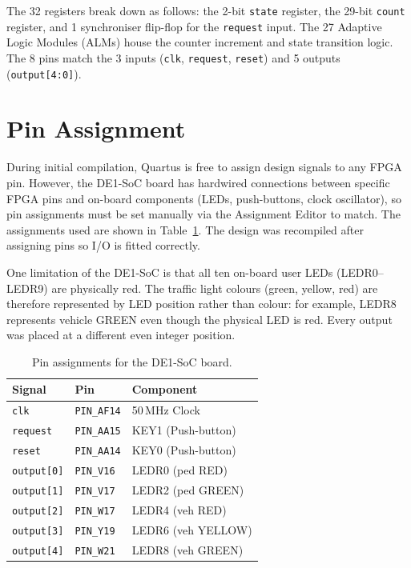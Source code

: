 \documentclass[10pt,a4paper]{article}
\theoremstyle{definition} %
\begin{document}
The 32 registers break down as follows: the 2-bit \texttt{state} register, the 29-bit \texttt{count} register, and 1 synchroniser flip-flop for the \texttt{request} input. The 27 Adaptive Logic Modules (ALMs) house the counter increment and state transition logic. The 8 pins match the 3 inputs (\texttt{clk}, \texttt{request}, \texttt{reset}) and 5 outputs (\texttt{output[4:0]}).

\section{Pin Assignment}

During initial compilation, Quartus is free to assign design signals to any FPGA pin. However, the DE1-SoC board has hardwired connections between specific FPGA pins and on-board components (LEDs, push-buttons, clock oscillator), so pin assignments must be set manually via the Assignment Editor to match. The assignments used are shown in Table~\ref{tab:pins}. The design was recompiled after assigning pins so I/O is fitted correctly.

One limitation of the DE1-SoC is that all ten on-board user LEDs (LEDR0--LEDR9) are physically red. The traffic light colours (green, yellow, red) are therefore represented by LED position rather than colour: for example, LEDR8 represents vehicle GREEN even though the physical LED is red. Every output was placed at a different even integer position.

\begin{table}[htbp]
    \centering
    \caption{Pin assignments for the DE1-SoC board.}
    \label{tab:pins}
    \begin{tabular}{lll}
        \toprule
        Signal             & Pin                & Component          \\
        \midrule
        \texttt{clk}       & \texttt{PIN\_AF14} & 50\,MHz Clock      \\
        \texttt{request}   & \texttt{PIN\_AA15} & KEY1 (Push-button) \\
        \texttt{reset}     & \texttt{PIN\_AA14} & KEY0 (Push-button) \\
        \texttt{output[0]} & \texttt{PIN\_V16}  & LEDR0 (ped RED)    \\
        \texttt{output[1]} & \texttt{PIN\_V17}  & LEDR2 (ped GREEN)  \\
        \texttt{output[2]} & \texttt{PIN\_W17}  & LEDR4 (veh RED)    \\
        \texttt{output[3]} & \texttt{PIN\_Y19}  & LEDR6 (veh YELLOW) \\
        \texttt{output[4]} & \texttt{PIN\_W21}  & LEDR8 (veh GREEN)  \\
        \bottomrule
    \end{tabular}
\end{table}
\end{document}
